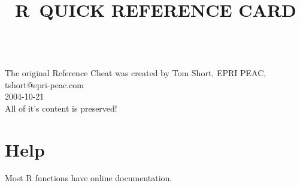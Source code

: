 

\def\content{R}
\def\versionnumber{1.0}  %
\def\year{2014}
\def\month{May}
\def\version{v\versionnumber\ \month\ \year}



\title{\content\ QUICK REFERENCE CARD}

\shortintro\\

The original Reference Cheat was created by Tom Short, EPRI PEAC,
tshort@epri-peac.com\\2004-10-21\\ All of it's content is preserved!


\section{Help}{Most R functions have online documentation.}

